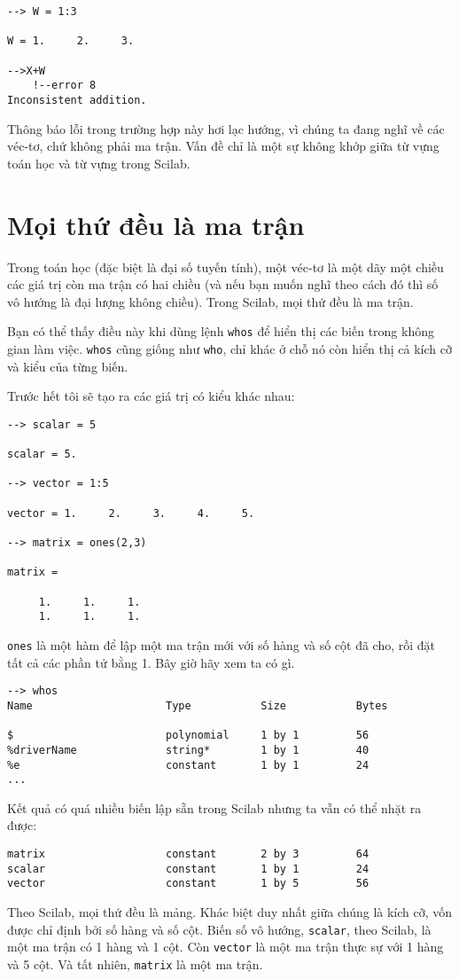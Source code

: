 \documentclass[12pt]{book}
\begin{document}
\begin{verbatim}
--> W = 1:3

W = 1.     2.     3.

-->X+W
    !--error 8 
Inconsistent addition.
\end{verbatim}
%
Thông báo lỗi trong trường hợp này hơi lạc hướng, vì chúng ta đang
nghĩ về các véc-tơ, chứ không phải ma trận. Vấn đề chỉ là một sự
không khớp giữa từ vựng toán học và từ vựng trong Scilab.



\section{Mọi thứ đều là ma trận}

Trong toán học (đặc biệt là đại số tuyến tính), một véc-tơ là một dãy
một chiều các giá trị còn ma trận có hai chiều (và nếu bạn muốn
nghĩ theo cách đó thì số vô hướng là đại lượng không chiều). 
Trong Scilab, mọi thứ đều là ma trận.

Bạn có thể thấy điều này khi dùng lệnh {\tt whos} để hiển thị các
biến trong không gian làm việc.  {\tt whos} cũng giống như 
{\tt who}, chỉ khác ở chỗ nó còn hiển thị cả kích cỡ và kiểu của
từng biến.

Trước hết tôi sẽ tạo ra các giá trị có kiểu khác nhau:

\begin{verbatim}
--> scalar = 5

scalar = 5.

--> vector = 1:5

vector = 1.     2.     3.     4.     5.

--> matrix = ones(2,3)

matrix =

     1.     1.     1.
     1.     1.     1.
\end{verbatim}
%
{\tt ones} là một hàm để lập một ma trận mới với số hàng và
số cột đã cho, rồi đặt tất cả các phần tử bằng 1. Bây giờ hãy
xem ta có gì.

\begin{verbatim}
--> whos
Name                     Type           Size           Bytes        
 
$                        polynomial     1 by 1         56           
%driverName              string*        1 by 1         40           
%e                       constant       1 by 1         24           
...
\end{verbatim}

Kết quả có quá nhiều biến lập sẵn trong Scilab nhưng ta
vẫn có thể nhặt ra được:
\begin{verbatim}
matrix                   constant       2 by 3         64         
scalar                   constant       1 by 1         24        
vector                   constant       1 by 5         56         
\end{verbatim}
%
Theo Scilab, mọi thứ đều là mảng.
Khác biệt duy nhất giữa chúng là kích cỡ, vốn được chỉ định
bởi số hàng và số cột. Biến số vô hướng, {\tt scalar}, theo
Scilab, là một ma trận có 1 hàng và 1 cột.  Còn {\tt vector} là
một ma trận thực sự với 1 hàng và 5 cột. Và tất nhiên, 
{\tt matrix} là một ma trận.
\end{document}
